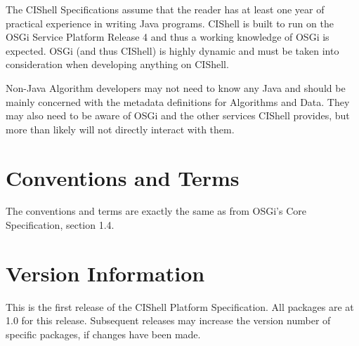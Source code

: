 The CIShell Specifications assume that the reader has at least one year of
practical experience in writing Java programs. CIShell is built to run on the
OSGi Service Platform Release 4 and thus a working knowledge of OSGi is expected.
OSGi (and thus CIShell) is highly dynamic and must be taken into consideration
when developing anything on CIShell.

Non-Java Algorithm developers may not need to know any Java and should be mainly
concerned with the metadata definitions for Algorithms and Data. They may also
need to be aware of OSGi and the other services CIShell provides, but more than
likely will not directly interact with them.

\section{Conventions and Terms}

The conventions and terms are exactly the same as from OSGi's Core
Specification, section 1.4.

\section{Version Information}

This is the first release of the CIShell Platform Specification. All packages are
at 1.0 for this release. Subsequent releases may increase the version number of
specific packages, if changes have been made.
